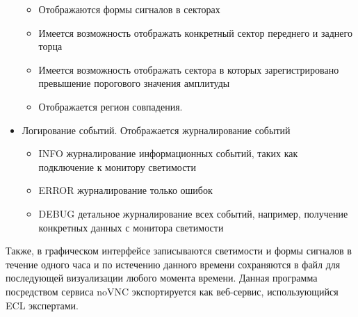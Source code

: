 \begin{itemize}
\begin{itemize}
    \item Отображаются формы сигналов в секторах
    \item Имеется возможность отображать конкретный сектор переднего и заднего торца
    \item Имеется возможность отображать сектора в которых зарегистрировано превышение порогового значения амплитуды
    \item Отображается регион совпадения.
  \end{itemize}
  \item Логирование событий. Отображается журналирование событий
    \begin{itemize}
      \item INFO журналирование информационных событий, таких как подключение к монитору светимости
      \item ERROR журналирование только ошибок
      \item DEBUG детальное журналирование всех событий, например, получение конкретных данных с монитора светимости
    \end{itemize}
\end{itemize}\par
  Также, в графическом интерфейсе записываются светимости и формы сигналов в течение одного часа и по истечению данного времени сохраняются в файл для последующей визуализации любого момента времени. Данная программа посредством сервиса noVNC экспортируется как веб-сервис, использующийся ECL экспертами.
